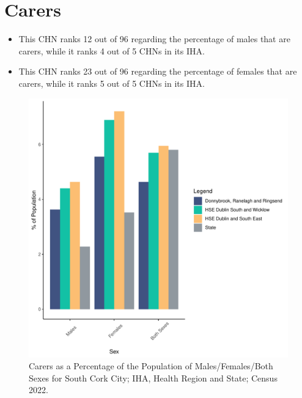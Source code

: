 \documentclass{article}
\begin{document}
\section{Carers}\label{sect:Carers}
\begin{itemize}
\item This CHN ranks  12 out of 96 regarding the percentage of males that are carers, while it ranks   4 out of 5 CHNs in its IHA.
\item This CHN ranks  23 out of 96 regarding the percentage of females that are carers, while it ranks   5 out of 5 CHNs in its IHA.
\end{itemize}
\begin{figure}[H]
	\centering
	\includegraphics[width = 150mm]{../figures/CareED.pdf}
	\caption{Carers as a Percentage of the Population of Males/Females/Both Sexes for South Cork City; IHA, Health Region and State; Census 2022.}
	\label{fig:2ae19629-1a6a-13a3-e055-000000000001}
	\end{figure}
\end{document}

